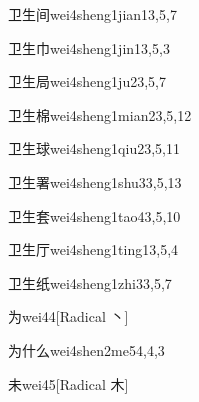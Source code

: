 \begin{entry}{卫生间}{wei4sheng1jian1}{3,5,7}
\end{entry}

\begin{entry}{卫生巾}{wei4sheng1jin1}{3,5,3}
\end{entry}

\begin{entry}{卫生局}{wei4sheng1ju2}{3,5,7}
\end{entry}

\begin{entry}{卫生棉}{wei4sheng1mian2}{3,5,12}
\end{entry}

\begin{entry}{卫生球}{wei4sheng1qiu2}{3,5,11}
\end{entry}

\begin{entry}{卫生署}{wei4sheng1shu3}{3,5,13}
\end{entry}

\begin{entry}{卫生套}{wei4sheng1tao4}{3,5,10}
\end{entry}

\begin{entry}{卫生厅}{wei4sheng1ting1}{3,5,4}
\end{entry}

\begin{entry}{卫生纸}{wei4sheng1zhi3}{3,5,7}
\end{entry}

\begin{entry}{为}{wei4}{4}[Radical 丶]
\end{entry}

\begin{entry}{为什么}{wei4shen2me5}{4,4,3}
\end{entry}

\begin{entry}{未}{wei4}{5}[Radical 木]
\end{entry}

